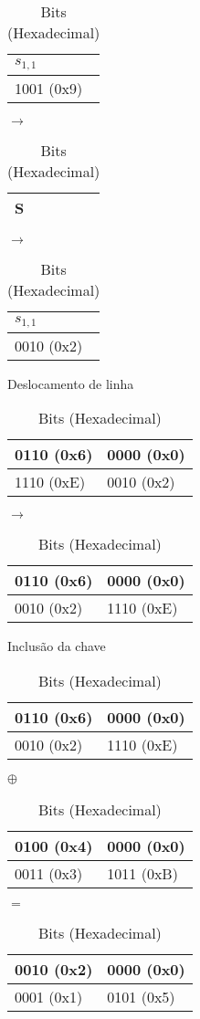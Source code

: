 \documentclass[
    article,            %
    11pt,               %
    oneside,            %
    a4paper,            %
    english,            %
    brazil,             %
    sumario=tradicional,
    ]{abntex2}
\begin{document}
\begin{table}[H]
\begin{tabular}{|l|}
\hline
$s_{1,1}$  \\ \hline
1001 (0x9)      \\ \hline
\end{tabular}
$\longrightarrow$
\begin{tabular}{|l|}
\hline
S  \\ \hline
\end{tabular}
$\longrightarrow$
\begin{tabular}{|l|}
\hline
$s_{1,1}$  \\ \hline
0010 (0x2)       \\ \hline
\end{tabular}

\caption*{Bits (Hexadecimal)}
\end{table}

\label{subsubsub:deslocar-linha-round2}

\begin{table}[H]
\centering
\caption{Deslocamento de linha}
\label{tabela-desloc-linha-round2}
\begin{tabular}{|l|l|}
\hline
0110 (0x6) & 0000 (0x0) \\ \hline
1110 (0xE) & 0010 (0x2) \\ \hline
\end{tabular}
$\longrightarrow$
\begin{tabular}{|l|l|}
\hline
0110 (0x6) & 0000 (0x0) \\ \hline
0010 (0x2) & 1110 (0xE) \\ \hline
\end{tabular}
\caption*{Bits (Hexadecimal)}
\end{table}

\label{subsubsub:include-key-round2}

\begin{table}[H]
\centering
\caption{Inclusão da chave}
\label{table-key_include-round2}
\begin{tabular}{|l|l|}
\hline
0110 (0x6) & 0000 (0x0) \\ \hline
0010 (0x2) & 1110 (0xE) \\ \hline
\end{tabular}
$\oplus$
\begin{tabular}{|l|l|}
\hline
0100 (0x4) & 0000 (0x0) \\ \hline
0011 (0x3) & 1011 (0xB) \\ \hline
\end{tabular}
$=$
\begin{tabular}{|l|l|}
\hline
0010 (0x2) & 0000 (0x0) \\ \hline
0001 (0x1) & 0101 (0x5) \\ \hline
\end{tabular}
\caption*{Bits (Hexadecimal)}
\end{table}
\end{document}
